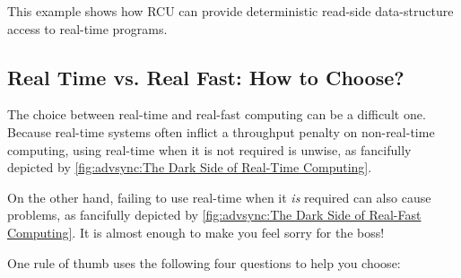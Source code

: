 This example shows how RCU can provide deterministic read-side
data-structure access to real-time programs.

\subsection{Real Time vs. Real Fast: How to Choose?}
\label{sec:advsync:Real Time vs. Real Fast: How to Choose?}

The choice between real-time and real-fast computing can be a difficult one.
Because real-time systems often inflict a throughput penalty on
non-real-time computing, using real-time when it is not required is
unwise, as fancifully depicted by
\cref{fig:advsync:The Dark Side of Real-Time Computing}.


On the other hand, failing to use real-time when it \emph{is} required
can also cause problems, as fancifully depicted by
\cref{fig:advsync:The Dark Side of Real-Fast Computing}.
It is almost enough to make you feel sorry for the boss!


One rule of thumb uses the following four questions to help you choose:

